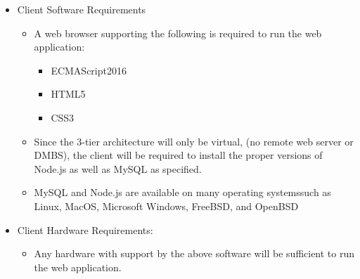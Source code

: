 \documentclass[letter, 12pt, titlepage]{article}
\begin{document}
		\begin{itemize}

			\item Client Software Requirements
			\begin{itemize}
				\item A web browser supporting the following is required to run the web application:
					\begin{itemize}
						\item ECMAScript2016
						\item HTML5
						\item CSS3
					\end{itemize}
			\item Since the 3-tier architecture will only be virtual, (no remote web server or DMBS), the client will be required to install the proper versions of Node.js as well as MySQL as specified. 
			
			\item  MySQL and Node.js are available on many operating systemssuch as Linux, MacOS, Microsoft Windows, FreeBSD, and OpenBSD	
			\end{itemize}

		\item Client Hardware Requirements:
			\begin{itemize}	
				\item Any hardware with support by the above software will be sufficient to run the web application.
			\end{itemize}
		\end{itemize}
\end{document}
